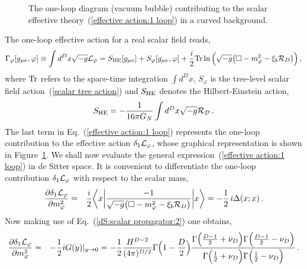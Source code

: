 \begin{figure}[tbp]
\centerline{\hspace{.in}
}
 \label{figure 2} 
\vskip -0.1in
\caption{\small
The one-loop diagram (vacuum bubble) contributing to the scalar effective
theory~(\ref{effective action:1 loop}) in a curved background.
}
\end{figure}
The one-loop effective action for a real scalar field reads,
\begin{equation}
 \Gamma_\varphi[g_{\mu\nu},\varphi] \equiv \int d^Dx \sqrt{-g}{\cal L}_\varphi
  = S_{\rm HE}[g_{\mu\nu}] + S_\varphi[g_{\mu\nu},\varphi]
   + \frac i2{\rm Tr}\ln\Big(
                          \sqrt{-g}\big(\Box - m_{\varphi}^2-\xi_b{\cal R}_D\big)
                        \Big)
\,,
\label{effective action:1 loop}
\end{equation}
where ${\rm Tr}$ refers to the space-time integration $\int d^Dx$,
$S_\varphi$ is the tree-level scalar field
action~(\ref{scalar tree action}) and $S_{\rm HE}$ denotes
the Hilbert-Einstein action,
\begin{equation}
 S_{\rm HE} = -\frac{1}{16\pi G_N} \int d^Dx \sqrt{-g}{\cal R_D}
\,.
\label{Hilbert-Einstein}
\end{equation}
The last term in Eq.~(\ref{effective action:1 loop}) represents
the one-loop contribution to the effective action $\delta_1 {\cal
L}_\varphi$, whose graphical representation is shown in
Figure~\ref{figure 2}.
 We shall now evaluate the general expression~(\ref{effective action:1 loop})
in de Sitter space. It is convenient to differentiate the
one-loop contribution $\delta_1 {\cal L}_\varphi$
with respect to the scalar mass,
\begin{eqnarray}
  \frac{\partial \delta_1{\cal L}_\varphi}{\partial m_\varphi^2} &=&
        \frac i2 \bigg\langle x\bigg|
               \frac{-1}{\sqrt{-g}\big(\Box - m_{\varphi}^2-\xi_b{\cal R}_D\big)}
            \bigg| x\bigg\rangle
        = -\frac12\, i{\Delta}(x;x)
\label{effective action:3} \,.
\end{eqnarray}
Now making use of Eq.~(\ref{dS:scalar propagator:2}) one obtains,
\begin{eqnarray}
  \frac{\partial \delta_1{\cal L}_\varphi}{\partial m_\varphi^2}
   &=& -\frac12 iG(y)|_{y\rightarrow 0}
      = -\frac12\frac{H^{D-2}}{(4\pi)^{D/2}}\Gamma\Big(1-\frac{D}{2}\Big)
           \frac{\Gamma\Big(\frac{D-1}{2}+\nu_D\Big)
                  \Gamma\Big(\frac{D-1}{2}-\nu_D\Big)}{\Gamma\Big(\frac{1}{2}+\nu_D\Big)
                    \Gamma\Big(\frac{1}{2}-\nu_D\Big)}
\,.
\label{effective action:scalars}
\end{eqnarray}
